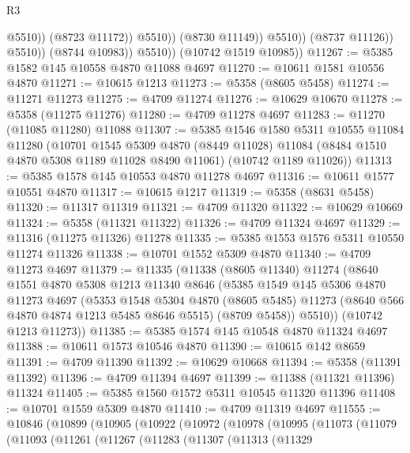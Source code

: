 \begin{lexlean}{R3}
\begin{coremodule}
                                  @5510))
                              (@8723 @11172))
                            @5510))
                        (@8730 @11149))
                      @5510))
                  (@8737 @11126))
                @5510))
            (@8744 @10983))
          @5510))
      (@10742 @1519 @10985))
@11267 := @5385 @1582 @145 @10558 @4870 @11088 @4697
@11270 := @10611 @1581 @10556 @4870
@11271 := @10615 @1213
@11273 := @5358 (@8605 @5458)
@11274 := @11271 @11273
@11275 := @4709 @11274
@11276 := @10629 @10670
@11278 := @5358 (@11275 @11276)
@11280 := @4709 @11278 @4697
@11283 := @11270 (@11085 @11280) @11088
@11307 := @5385
    @1546
    @1580
    @5311
    @10555
    @11084
    @11280
    (@10701
      @1545
      @5309
      @4870
      (@8449 @11028)
      @11084
      (@8484 @1510 @4870 @5308 @1189 @11028 @8490 @11061)
      (@10742 @1189 @11026))
@11313 := @5385 @1578 @145 @10553 @4870 @11278 @4697
@11316 := @10611 @1577 @10551 @4870
@11317 := @10615 @1217
@11319 := @5358 (@8631 @5458)
@11320 := @11317 @11319
@11321 := @4709 @11320
@11322 := @10629 @10669
@11324 := @5358 (@11321 @11322)
@11326 := @4709 @11324 @4697
@11329 := @11316 (@11275 @11326) @11278
@11335 := @5385 @1553 @1576 @5311 @10550 @11274 @11326
@11338 := @10701 @1552 @5309 @4870
@11340 := @4709 @11273 @4697
@11379 := @11335
    (@11338
      (@8605 @11340)
      @11274
      (@8640
        @1551
        @4870
        @5308
        @1213
        @11340
        @8646
        (@5385
          @1549
          @145
          @5306
          @4870
          @11273
          @4697
          (@5353
            @1548
            @5304
            @4870
            (@8605 @5485)
            @11273
            (@8640 @566 @4870 @4874 @1213 @5485 @8646 @5515)
            (@8709 @5458))
          @5510))
      (@10742 @1213 @11273))
@11385 := @5385 @1574 @145 @10548 @4870 @11324 @4697
@11388 := @10611 @1573 @10546 @4870
@11390 := @10615 @142 @8659
@11391 := @4709 @11390
@11392 := @10629 @10668
@11394 := @5358 (@11391 @11392)
@11396 := @4709 @11394 @4697
@11399 := @11388 (@11321 @11396) @11324
@11405 := @5385 @1560 @1572 @5311 @10545 @11320 @11396
@11408 := @10701 @1559 @5309 @4870
@11410 := @4709 @11319 @4697
@11555 := @10846
    (@10899
      (@10905
        (@10922
          (@10972
            (@10978
              (@10995
                (@11073
                  (@11079
                    (@11093
                      (@11261
                        (@11267
                          (@11283
                            (@11307
                              (@11313
                                (@11329

\end{coremodule}
\end{lexlean}
